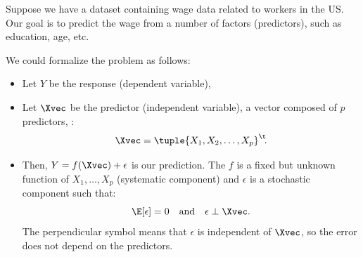 \begin{example}
    Suppose we have a dataset containing wage data related to workers in the US. Our goal is to predict the wage from a number of factors (predictors), such as education, age, etc.

    We could formalize the problem as follows:
    \begin{itemize}
        \item Let $Y$ be the response (dependent variable),
        \item Let $\Xvec$ be the predictor (independent variable), a vector composed of $p$ predictors, \ie:
            \begin{equation}
                \Xvec = \tuple{X_1, X_2, \dots, X_p}^\t \negmedspace.
            \end{equation}
        \item Then, $Y = f(\Xvec) + \epsilon$ is our prediction. The $f$ is a fixed but unknown function of $X_1, \dots, X_p$ (systematic component) and $\epsilon$ is a stochastic component such that:
            \begin{equation}
                \E[\epsilon] = 0 \quad\text{and}\quad\epsilon\perp\Xvec.
            \end{equation}
            The perpendicular symbol means that $\epsilon$ is independent of $\Xvec$, so the error does not depend on the predictors.\qedhere
    \end{itemize}
\end{example}

